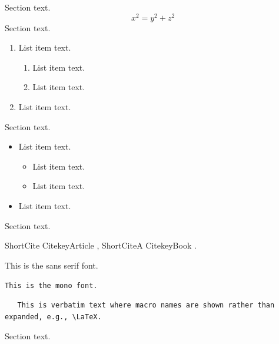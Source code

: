 \documentclass[draft]{agujournal2025}
\begin{document}
Section text.
 \begin{equation}
 x^2=y^2 + z^2
 \end{equation}
Section text.
%
\begin{enumerate}
    \item List item text.
        \begin{enumerate} %
          \item List item text.
          \item List item text.
        \end{enumerate}
    \item List item text.
\end{enumerate}
Section text.
\begin{itemize}
    \item List item text.
        \begin{itemize}
          \item List item text. 
          \item List item text.
        \end{itemize}
    \item List item text.
\end{itemize}
Section text.

ShortCite CitekeyArticle \cite{CitekeyArticle}, ShortCiteA CitekeyBook . 

\textsf{This is the sans serif font.}

 \texttt{This is the mono font.}
 

\begin{verbatim}  
   This is verbatim text where macro names are shown rather than expanded, e.g., \LaTeX.
\end{verbatim}

Section text.



%
\end{document}
